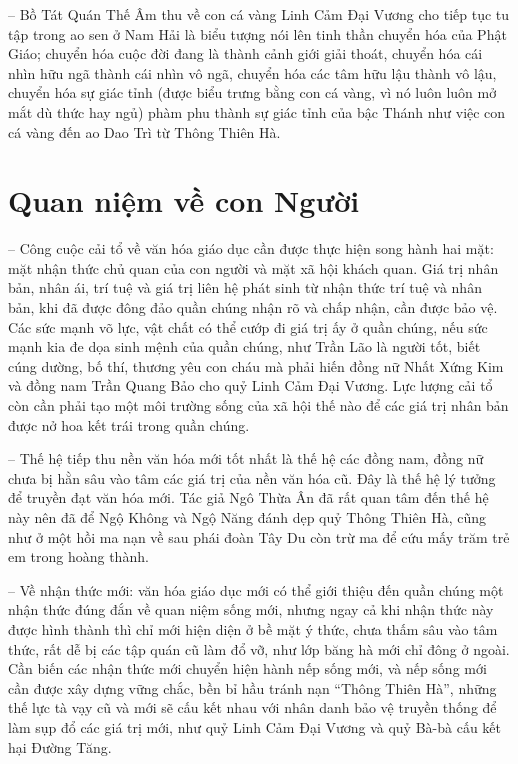 -- Bồ Tát Quán Thế Âm thu về con cá vàng Linh Cảm Đại Vương cho tiếp tục tu tập trong ao sen ở Nam Hải là biểu tượng nói lên tinh thần chuyển hóa của Phật Giáo; chuyển hóa cuộc đời đang là thành cảnh giới giải thoát, chuyển hóa cái nhìn hữu ngã thành cái nhìn vô ngã, chuyển hóa các tâm hữu lậu thành vô lậu, chuyển hóa sự giác tỉnh (được biểu trưng bằng con cá vàng, vì nó luôn luôn mở mắt dù thức hay ngủ) phàm phu thành sự giác tỉnh của bậc Thánh như việc con cá vàng đến ao Dao Trì từ Thông Thiên Hà.

\section{Quan niệm về con Người} %
\label{sec:47_48_con_nguoi}

-- Công cuộc cải tổ về văn hóa giáo dục cần được thực hiện song hành hai mặt: mặt nhận thức chủ quan của con người và mặt xã hội khách quan. Giá trị nhân bản, nhân ái, trí tuệ và giá trị liên hệ phát sinh từ nhận thức trí tuệ và nhân bản, khi đã được đông đảo quần chúng nhận rõ và chấp nhận, cần được bảo vệ. Các sức mạnh võ lực, vật chất có thể cướp đi giá trị ấy ở quần chúng, nếu sức mạnh kia đe dọa sinh mệnh của quần chúng, như Trần Lão là người tốt, biết cúng dường, bố thí, thương yêu con cháu mà phải hiến đồng nữ Nhất Xứng Kim và đồng nam Trần Quang Bảo cho quỷ Linh Cảm Đại Vương. Lực lượng cải tổ còn cần phải tạo một môi trường sống của xã hội thế nào để các giá trị nhân bản được nở hoa kết trái trong quần chúng.

-- Thế hệ tiếp thu nền văn hóa mới tốt nhất là thế hệ các đồng nam, đồng nữ chưa bị hằn sâu vào tâm các giá trị của nền văn hóa cũ. Đây là thế hệ lý tưởng để truyền đạt văn hóa mới. Tác giả Ngô Thừa Ân đã rất quan tâm đến thế hệ này nên đã để Ngộ Không và Ngộ Năng đánh dẹp quỷ Thông Thiên Hà, cũng như ở một hồi ma nạn về sau phái đoàn Tây Du còn trừ ma để cứu mấy trăm trẻ em trong hoàng thành.

-- Về nhận thức mới: văn hóa giáo dục mới có thể giới thiệu đến quần chúng một nhận thức đúng đắn về quan niệm sống mới, nhưng ngay cả khi nhận thức này được hình thành thì chỉ mới hiện diện ở bề mặt ý thức, chưa thấm sâu vào tâm thức, rất dễ bị các tập quán cũ làm đổ vỡ, như lớp băng hà mới chỉ đông ở ngoài. Cần biến các nhận thức mới chuyển hiện hành nếp sống mới, và nếp sống mới cần được xây dựng vững chắc, bền bỉ hầu tránh nạn ``Thông Thiên Hà'', những thế lực tà vạy cũ và mới sẽ cấu kết nhau với nhân danh bảo vệ truyền thống để làm sụp đổ các giá trị mới, như quỷ Linh Cảm Đại Vương và quỷ Bà-bà cấu kết hại Đường Tăng.

